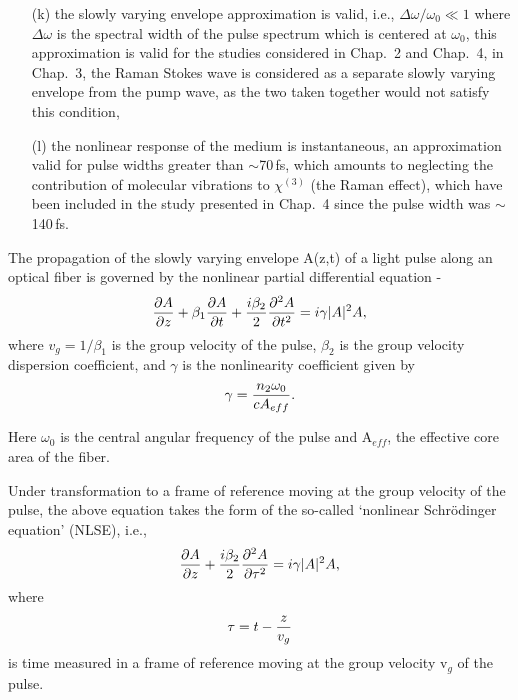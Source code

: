 \begin{enumerate}
\item[(k)] the slowly varying envelope approximation is valid, i.e.,
$\Delta\omega/\omega_{0} \ll 1$ where $\Delta \omega$ is the spectral
width of the pulse spectrum which is centered at $\omega_{0}$, this approximation is valid for the studies considered in Chap.\ 2 and Chap.\ 4, in Chap.\ 3, the Raman Stokes wave is considered as a separate slowly varying envelope from the pump wave, as the two taken together would not satisfy this condition,
\item[(l)] the nonlinear response of the medium is instantaneous, an
approximation valid for pulse widths greater than $\sim$70\,fs, which amounts to neglecting the contribution of molecular vibrations to $\chi^{(3)}$ (the Raman effect), which have been included in the study presented in Chap.\ 4 since the pulse width was $\sim$ 140\,fs.
\end{enumerate}
The propagation of the slowly varying envelope A(z,t) of a light
pulse
along an optical fiber is governed by the nonlinear partial
differential equation \cite{Agrawal2} -
\begin{equation}
{\partial A \over \partial z} + \beta_{1} {\partial A \over \partial t} + {i \beta_{2} \over 2} {\partial^{2} A \over \partial t^{2}} = i \gamma |A|^{2}A,
\end{equation}
where $v_{g}=1/\beta_{1}$ is the group velocity of the pulse,
$\beta_{2}$
is the group velocity dispersion coefficient, %
and $\gamma$ is the nonlinearity coefficient given by
\begin{equation}
\gamma = {n_{2}\omega_{0} \over c A_{eff}} .
\end{equation}

Here $\omega_{0}$ is the central angular frequency of the pulse and
A$_{eff}$, the effective core area of the fiber.

Under transformation to  a frame of reference moving at the group
velocity of the pulse, the above equation takes the form of the so-called
`nonlinear Schr\"odinger equation' (NLSE), i.e.,
\begin{equation}
{\partial A \over \partial z} + {i\beta_2 \over 2} {\partial^2
A \over \partial \tau^2} = i \gamma |A|^2A ,
\end{equation}
where
\begin{equation}
\tau = t - {z \over v_g}
\end{equation}
is time measured in a frame of reference moving at the group
velocity
v$_g$ of the pulse.

